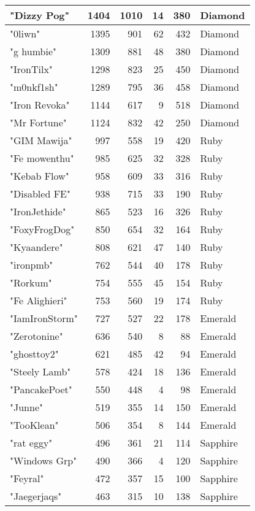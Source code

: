 \documentclass{article}
\begin{document}
\begin{table}[htbp]
\begin{tabular}{|l|r|r|r|r|l|}
"Dizzy Pog" & 1404 & 1010 & 14 & 380 & Diamond \\ \hline
"0liwn" & 1395 & 901 & 62 & 432 & Diamond \\ \hline
"g humbie" & 1309 & 881 & 48 & 380 & Diamond \\ \hline
"IronTilx" & 1298 & 823 & 25 & 450 & Diamond \\ \hline
"m0nkf1sh" & 1289 & 795 & 36 & 458 & Diamond \\ \hline
"Iron Revoka" & 1144 & 617 & 9 & 518 & Diamond \\ \hline
"Mr Fortune" & 1124 & 832 & 42 & 250 & Diamond \\ \hline
"GIM Mawija" & 997 & 558 & 19 & 420 & Ruby \\ \hline
"Fe mowenthu" & 985 & 625 & 32 & 328 & Ruby \\ \hline
"Kebab Flow" & 958 & 609 & 33 & 316 & Ruby \\ \hline
"Disabled FE" & 938 & 715 & 33 & 190 & Ruby \\ \hline
"IronJethide" & 865 & 523 & 16 & 326 & Ruby \\ \hline
"FoxyFrogDog" & 850 & 654 & 32 & 164 & Ruby \\ \hline
"Kyaandere" & 808 & 621 & 47 & 140 & Ruby \\ \hline
"ironpmb" & 762 & 544 & 40 & 178 & Ruby \\ \hline
"Rorkum" & 754 & 555 & 45 & 154 & Ruby \\ \hline
"Fe Alighieri" & 753 & 560 & 19 & 174 & Ruby \\ \hline
"IamIronStorm" & 727 & 527 & 22 & 178 & Emerald \\ \hline
"Zerotonine" & 636 & 540 & 8 & 88 & Emerald \\ \hline
"ghosttoy2" & 621 & 485 & 42 & 94 & Emerald \\ \hline
"Steely Lamb" & 578 & 424 & 18 & 136 & Emerald \\ \hline
"PancakePoet" & 550 & 448 & 4 & 98 & Emerald \\ \hline
"Junne" & 519 & 355 & 14 & 150 & Emerald \\ \hline
"TooKlean" & 506 & 354 & 8 & 144 & Emerald \\ \hline
"rat eggy" & 496 & 361 & 21 & 114 & Sapphire \\ \hline
"Windows Grp" & 490 & 366 & 4 & 120 & Sapphire \\ \hline
"Feyral" & 472 & 357 & 15 & 100 & Sapphire \\ \hline
"Jaegerjaqs" & 463 & 315 & 10 & 138 & Sapphire \\ \hline

\end{tabular}
\end{table}
\end{document}
